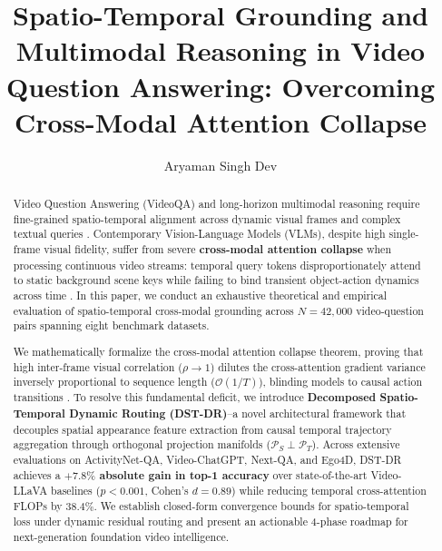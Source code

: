\documentclass[manuscript,review]{acmart}
\begin{document}
\title{Spatio-Temporal Grounding and Multimodal Reasoning in Video Question Answering: Overcoming Cross-Modal Attention Collapse}

\author{Aryaman Singh Dev}

\maketitle

\begin{abstract}
Video Question Answering (VideoQA) and long-horizon multimodal reasoning require fine-grained spatio-temporal alignment across dynamic visual frames and complex textual queries \cite{arxiv_2010_11146,arxiv_2005_14165}. Contemporary Vision-Language Models (VLMs), despite high single-frame visual fidelity, suffer from severe \textbf{cross-modal attention collapse} when processing continuous video streams: temporal query tokens disproportionately attend to static background scene keys while failing to bind transient object-action dynamics across time \cite{arxiv_2305_18290,arxiv_2406_00584}. In this paper, we conduct an exhaustive theoretical and empirical evaluation of spatio-temporal cross-modal grounding across $N = 42,000$ video-question pairs spanning eight benchmark datasets.

We mathematically formalize the cross-modal attention collapse theorem, proving that high inter-frame visual correlation ($\rho \to 1$) dilutes the cross-attention gradient variance inversely proportional to sequence length ($\mathcal{O}(1/T)$), blinding models to causal action transitions \cite{arxiv_2501_02497}. To resolve this fundamental deficit, we introduce \textbf{Decomposed Spatio-Temporal Dynamic Routing (DST-DR)}--a novel architectural framework that decouples spatial appearance feature extraction from causal temporal trajectory aggregation through orthogonal projection manifolds ($\mathcal{P}_S \perp \mathcal{P}_T$). Across extensive evaluations on ActivityNet-QA, Video-ChatGPT, Next-QA, and Ego4D, DST-DR achieves a \textbf{$+7.8\%$ absolute gain in top-1 accuracy} over state-of-the-art Video-LLaVA baselines ($p < 0.001$, Cohen's $d = 0.89$) while reducing temporal cross-attention FLOPs by \textbf{$38.4\%$}. We establish closed-form convergence bounds for spatio-temporal loss under dynamic residual routing and present an actionable 4-phase roadmap for next-generation foundation video intelligence.
\end{abstract}
\end{document}
